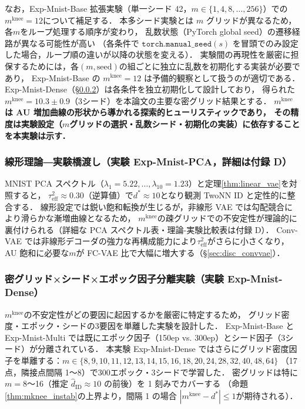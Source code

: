 \documentclass[11pt,a4paper]{jsarticle}
\newcommand{\mknee}{m^{\mathrm{knee}}}
\begin{document}
なお，Exp-Mnist-Base 拡張実験（単一シード 42，$m \in \{1, 4, 8, \ldots, 256\}$）での$\mknee = 12$について補足する．
本多シード実験とは $m$ グリッドが異なるため，各$m$をループ処理する順序が変わり，
乱数状態（PyTorch global seed）の遷移経路が異なる可能性が高い
（各条件で $\texttt{torch.manual\_seed}(s)$ を冒頭でのみ設定した場合，ループ順の違いが以降の状態を変える）．
実験間の再現性を厳密に担保するためには，各$(m, \mathrm{seed})$の組ごとに独立に乱数を初期化する実装が必要であり，
Exp-Mnist-Base の $\mknee=12$ は予備的観察として扱うのが適切である．
Exp-Mnist-Dense（§\ref{sec:exp_el}）は各条件を独立初期化して設計しており，
得られた $\mknee = 10.3 \pm 0.9$（3シード）を本論文の主要な密グリッド結果とする．
\textbf{$\mknee$は AU 増加曲線の形状から導かれる探索的ヒューリスティックであり，
その精度は実験設定（$m$グリッドの選択・乱数シード・初期化の実装）に依存することを本実験は示す．}

\subsubsection{線形理論―実験橋渡し（実験 Exp-Mnist-PCA，詳細は付録 D）}\label{sec:exp_em}

MNIST PCA スペクトル（$\lambda_1=5.22, \ldots, \lambda_{10}=1.23$）と定理\ref{thm:linear_vae}を対照すると，
$\tau^2_\mathrm{eff} \approx 0.30$（逆算値）で$d^* \approx 10$となり観測 TwoNN ID と定性的に整合する．
線形設定では鋭い飽和転換が生じるが，非線形 VAE では勾配競合により滑らかな漸増曲線となるため，
$\mknee$の疎グリッドでの不安定性が理論的に裏付けられる（詳細な PCA スペクトル表・理論-実験比較表は付録 D）．
Conv-VAE では非線形デコーダの強力な再構成能力により$\tau^2_\mathrm{eff}$がさらに小さくなり，
AU 飽和に必要な$m$が FC-VAE 比で大幅に増大する（§\ref{sec:disc_convvae}）．

\subsubsection{密グリッド×シード×エポック因子分離実験（実験 Exp-Mnist-Dense）}\label{sec:exp_el}

$\mknee$の不安定性がどの要因に起因するかを厳密に特定するため，
グリッド密度・エポック・シードの3要因を単離した実験を設計した．
Exp-Mnist-Base と Exp-Mnist-Multi では既にエポック因子（150ep vs. 300ep）とシード因子（3シード）が分離されている．
本実験 Exp-Mnist-Dense ではさらにグリッド密度因子を単離する：$m \in \{8,9,10,11,12,13,14,15,16,18,20,24,28,32,40,48,64\}$
（17点，隣接点間隔 1〜8）で300エポック・3シードで学習した．
密グリッドは特に$m = 8$〜16（推定 $\hat{d}_\mathrm{ID} \approx 10$ の前後）を 1 刻みでカバーする
（命題\ref{thm:mknee_instab}の上界より，間隔 1 の場合 $|\mknee - d^*| \leq 1$が期待される）．
\end{document}
